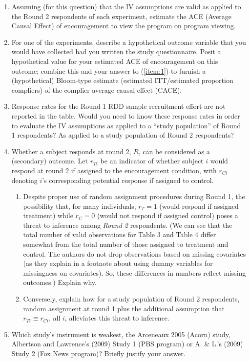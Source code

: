 \documentclass{article}
\begin{document}
\begin{enumerate}
\item \label{item:1}Assuming (for this question) that the IV assumptions are
     valid as applied to the Round 2 respondents of each experiment, estimate
     the ACE (Average Causal Effect) of encouragement to view the program on
     program viewing.
\item For one of the experiments, describe a hypothetical outcome variable that
     you would have collected had you written the study questionnaire. Posit a
     hypothetical value for your estimated ACE of encouragement on this outcome;
     combine this and your answer to (\ref{item:1}) to furnish a (hypothetical)
     Bloom-type estimate (estimated ITT/estimated proportion compliers) of the
     complier average causal effect (CACE).
\item Response rates for the Round 1 RDD sample recruitment effort are not
     reported in the table. Would you need to know these response rates in order
     to evaluate the IV assumptions as applied to a ``study population'' of
     Round 1 respondents?  As applied to a study population of Round 2
     respondents?
\item Whether a subject responds at round 2, $R$, can be considered as a
     (secondary) outcome. Let $r_{Ti}$ be an indicator of whether subject $i$
     would respond at round 2 if assigned to the encouragement condition, with
     $r_{Ci}$ denoting $i$'s corresponding potential response if assigned to
     control. \begin{enumerate}
  \item Despite proper use of random assignment procedures during Round 1, the
       possibility that, for many individuals, $r_{T}=1$ (would respond if
       assigned treatment) while $r_{C}=0$ (would not respond if assigned
       control) poses a threat to inference among \textit{Round 2} respondents.
       (We can see that the total number of valid observations for Table 3 and
       Table 4 differ somewhat from the total number of those assigned to treatment and
       control. The authors do not drop observations based on missing covariates
       (as they explain in a footnote about using dummy variables for
       missingness on covariates). So, these differences in numbers reflect missing
       outcomes.)
       Explain why.
  \item Conversely, explain how for a study population of Round 2 respondents,
       random assignment at round 1 plus the additional assumption that $r_{Ti}
       \equiv r_{Ci}$, all $i$, alleviates this threat to inference.
  \end{enumerate}
\item Which study's instrument is weakest, the Arceneaux 2005 (Acorn) study,
    Albertson and Lawrence's (2009) Study 1 (PBS program) or A. \& L.'s (2009)
    Study 2 (Fox News program)? Briefly justify your answer.
\end{enumerate}
\end{document}
